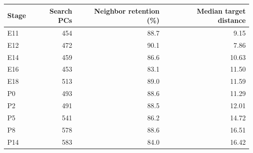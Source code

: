 \begin{tabular}{lrrr}\toprule
Stage & Search PCs & Neighbor retention (\%) & Median target distance \\ \midrule
E11 & 454 & 88.7 & 9.15 \\
E12 & 472 & 90.1 & 7.86 \\
E14 & 459 & 86.6 & 10.63 \\
E16 & 453 & 83.1 & 11.50 \\
E18 & 513 & 89.0 & 11.59 \\
P0 & 493 & 88.6 & 11.29 \\
P2 & 491 & 88.5 & 12.01 \\
P5 & 541 & 86.2 & 14.72 \\
P8 & 578 & 88.6 & 16.51 \\
P14 & 583 & 84.0 & 16.42 \\
\bottomrule\end{tabular}

